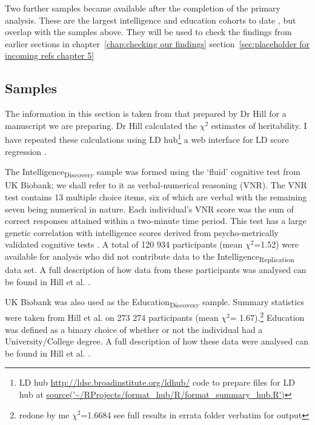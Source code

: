 Two further samples became available after the completion of the primary analysis. These are the largest intelligence and education cohorts to date \cite{savage2018genome}, \cite{lee2018gene} but overlap with the samples above. They will be used to check the findings from earlier sections in chapter~\ref{chap:checking our findings} section~\ref{sec:placeholder for incoming refs chapter 5}

\subsection{Samples}

\label{sec:samples from paper section}
The information in this section is taken from that prepared by Dr Hill for a manuscript we are preparing. Dr Hill calculated the $\chi^2$ estimates of heritability. I have repeated these calculations using LD hub\footnote{LD hub \url{http://ldsc.broadinstitute.org/ldhub/} code to prepare files for LD hub at \url{source('~/RProjects/format_hub/R/format_summary_hub.R')}} a web interface for LD score regression \cite{zheng2017ld}.

 The Intelligence\textsubscript{Discovery} sample was formed using the ‘fluid’ cognitive test from UK Biobank; we shall refer to it as verbal-numerical reasoning (VNR). The VNR test contains 13 multiple choice items, six of which are verbal with the remaining seven being numerical in nature. Each individual’s VNR score was the sum of correct responses attained within a two-minute time period. This test has a large genetic correlation with intelligence scores derived from psycho-metrically validated cognitive tests \cite{hill2019combined}. A total of 120 934 participants (mean $\chi^2$=1.52) were available for analysis who did not contribute data to the Intelligence\textsubscript{Replication}\cite{sniekers2017genome} data set. A full description of how data from these participants was analysed can be found in Hill et al. \cite{hill2019combined}. 
 
UK Biobank was also used as the Education\textsubscript{Discovery} sample. Summary statistics were taken from Hill et al. on 273 274 participants (mean  $\chi^2$= 1.67).\footnote{redone by me  $\chi^2$=1.6684 see full results in errata folder verbatim for output} \cite{hill2019combined}  Education was defined as a binary choice of whether or not the individual had a University/College degree. A full description of how these data were analysed can be found in Hill et al. \cite{hill2019combined}.

